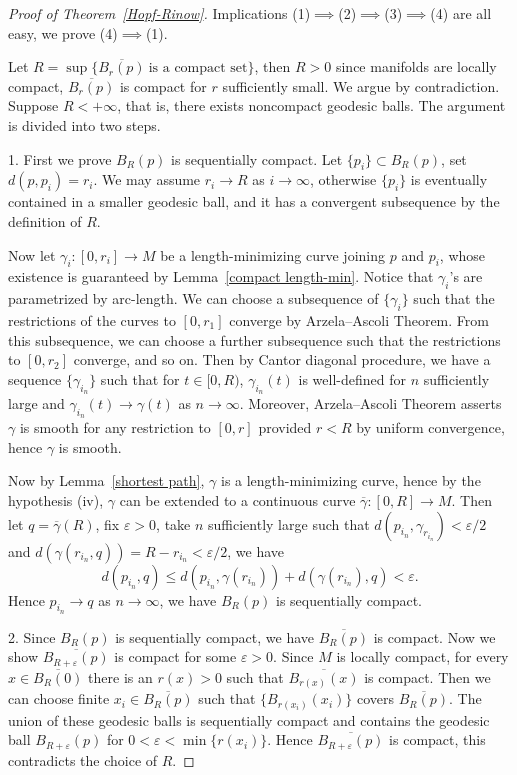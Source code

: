 \begin{proof}[Proof of Theorem~\ref{Hopf-Rinow}]
    Implications (1)$\implies$(2)$\implies$(3)$\implies$(4) are all easy, we prove (4)$\implies$(1).

    Let $R=\sup\{\overline{B_r(p)}\ \text{is a compact set}\}$, then $R>0$ since manifolds are locally compact, $\overline{B_r(p)}$ is compact for $r$ sufficiently small.
    We argue by contradiction.
    Suppose $R<+\infty$, that is, there exists noncompact geodesic balls.
    The argument is divided into two steps.

    1. First we prove $B_R(p)$ is sequentially compact.
    Let $\{p_i\}\subset B_R(p)$, set $d(p,p_i)=r_i$.
    We may assume $r_i\to R$ as $i\to\infty$, otherwise $\{p_i\}$ is eventually contained in a smaller geodesic ball, and it has a convergent subsequence by the definition of $R$.

    Now let $\gamma_i:[0,r_i]\to M$ be a length-minimizing curve joining $p$ and $p_i$, whose existence is guaranteed by Lemma~\ref{compact length-min}.
    Notice that $\gamma_i$'s are parametrized by arc-length.
    We can choose a subsequence of $\{\gamma_i\}$ such that the restrictions of the curves to $[0,r_1]$ converge by Arzela--Ascoli Theorem.
    From this subsequence, we can choose a further subsequence such that the restrictions to $[0,r_2]$ converge, and so on.
    Then by Cantor diagonal procedure, we have a sequence $\{\gamma_{i_n}\}$ such that for $t\in[0,R)$, $\gamma_{i_n}(t)$ is well-defined for $n$ sufficiently large and $\gamma_{i_n}(t)\to\gamma(t)$ as $n\to\infty$.
    Moreover, Arzela--Ascoli Theorem asserts $\gamma$ is smooth for any restriction to $[0,r]$ provided $r<R$ by uniform convergence, hence $\gamma$ is smooth.

    Now by Lemma~\ref{shortest path}, $\gamma$ is a length-minimizing curve, hence by the hypothesis (iv), $\gamma$ can be extended to a continuous curve $\overline{\gamma}:[0,R]\to M$.
    Then let $q=\overline{\gamma}(R)$, fix $\varepsilon>0$, take $n$ sufficiently large such that $d(p_{i_n},\gamma_{r_{i_n}})<\varepsilon/2$ and $d(\gamma(r_{i_n},q))=R-r_{i_n}<\varepsilon/2$, we have
    \[d(p_{i_n},q)\leq d(p_{i_n},\gamma(r_{i_n}))+d(\gamma(r_{i_n}),q)<\varepsilon.\]
    Hence $p_{i_n}\to q$ as $n\to\infty$, we have $B_R(p)$ is sequentially compact.

    2. Since $B_R(p)$ is sequentially compact, we have $\overline{B_R(p)}$ is compact.
    Now we show $\overline{B_{R+\varepsilon}(p)}$ is compact for some $\varepsilon>0$.
    Since $M$ is locally compact, for every $x\in\overline{B_R(0)}$ there is an $r(x)>0$ such that $\overline{B_{r(x)}(x)}$ is compact.
    Then we can choose finite $x_i\in\overline{B_R(p)}$ such that $\{B_{r(x_i)}(x_i)\}$ covers $\overline{B_R(p)}$.
    The union of these geodesic balls is sequentially compact and contains the geodesic ball $B_{R+\varepsilon}(p)$ for $0<\varepsilon<\min\{r(x_i)\}$.
    Hence $\overline{B_{R+\varepsilon}(p)}$ is compact, this contradicts the choice of $R$.
\end{proof}

